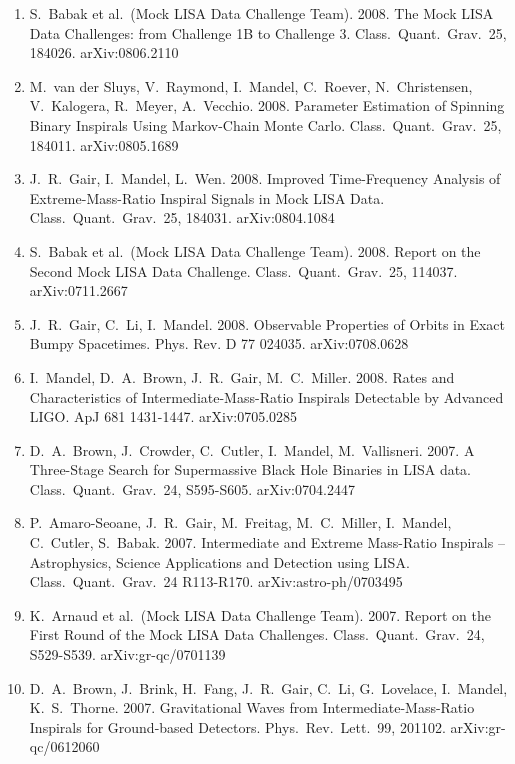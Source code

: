 \documentclass[margin,line]{res}
\begin{document}
\begin{resume}
\begin{enumerate}
\item  S.~Babak et al.~(Mock LISA Data Challenge Team). 2008. The Mock LISA Data Challenges: from Challenge 1B to Challenge 3.  Class.~Quant.~Grav.~25, 184026.
arXiv:0806.2110 

\item  M.~van der Sluys, V.~Raymond, I.~Mandel, C.~Roever, N.~Christensen, 
V.~Kalogera, R.~Meyer, A.~Vecchio.  2008. Parameter Estimation of 
Spinning Binary Inspirals Using Markov-Chain Monte Carlo.  Class.~Quant.~Grav.~25, 184011.
arXiv:0805.1689

\item  J.~R.~Gair, I.~Mandel, L.~Wen. 2008. Improved Time-Frequency Analysis of 
Extreme-Mass-Ratio Inspiral Signals in Mock LISA Data. Class.~Quant.~Grav.~25, 184031.
arXiv:0804.1084

\item  S.~Babak et al.~(Mock LISA Data Challenge Team). 2008. Report on the 
Second Mock LISA Data Challenge.  Class.~Quant.~Grav.~25, 114037.
arXiv:0711.2667

\item  J.~R.~Gair, C.~Li, I.~Mandel. 2008. Observable Properties of Orbits in 
Exact Bumpy Spacetimes.  Phys. Rev. D 77 024035.  arXiv:0708.0628

\item  I.~Mandel, D.~A.~Brown, J.~R.~Gair, M.~C.~Miller. 2008. Rates and 
Characteristics of Intermediate-Mass-Ratio Inspirals Detectable by 
Advanced LIGO.  ApJ 681 1431-1447. arXiv:0705.0285

\item  D.~A.~Brown, J.~Crowder, C.~Cutler, I.~Mandel, M.~Vallisneri. 2007.  A 
Three-Stage Search for Supermassive Black Hole Binaries in LISA data. 
Class.~Quant.~Grav.~24, S595-S605. arXiv:0704.2447

\item  P.~Amaro-Seoane, J.~R.~Gair, M.~Freitag, M.~C.~Miller, I.~Mandel,
C.~Cutler, S.~Babak. 2007.  Intermediate and Extreme Mass-Ratio  
Inspirals -- Astrophysics, Science Applications and Detection using
LISA.  Class.~Quant.~Grav.~24 R113-R170. arXiv:astro-ph/0703495

\item  K.~Arnaud et al.~(Mock LISA Data Challenge Team).  2007. Report on the 
First Round of the Mock LISA Data Challenges.  Class.~Quant.~Grav.~24, 
S529-S539. arXiv:gr-qc/0701139

\item  D.~A.~Brown, J.~Brink, H.~Fang, J.~R.~Gair, C.~Li, G.~Lovelace, 
I.~Mandel, K.~S.~Thorne. 2007.  Gravitational Waves from 
Intermediate-Mass-Ratio Inspirals for Ground-based Detectors. Phys.~Rev.~Lett.~99, 201102. arXiv:gr-qc/0612060


\end{enumerate}
\end{resume}
\end{document}
